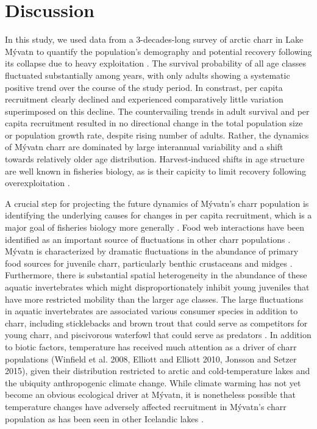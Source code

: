 
\section*{Discussion}

In this study, 
we used data from a 3-decades-long survey of arctic charr in Lake M\'{y}vatn
to quantify the population's demography and potential recovery 
following its collapse due to heavy exploitation 
\citep{gudbergsson2004}.
The survival probability of all age classes fluctuated substantially among years,
with only adults showing a systematic positive trend over the course of the study period.
In constrast, per capita recruitment clearly declined and experienced comparatively little
variation superimposed on this decline.
The countervailing trends in adult survival and per capita recruitment resulted 
in no directional change in the total population size or population growth rate,
despite rising number of adults.
Rather, the dynamics of  M\'{y}vatn charr are dominated by large interannual variability
and a shift towards relatively older age distribution.
Harvest-induced shifts in age structure are well known in fisheries biology,
as is their capicity to limit recovery following overexploitation 
\citep{hsieh2010fishing}.

A crucial step for projecting the future dynamics of M\'{y}vatn’s charr population 
is identifying the underlying causes for changes in per capita recruitment, 
which is a major goal of fisheries biology more generally 
\citep{houde2008emerging, ludsin2014physical, hansen2013rapid}.
Food web interactions have been identified as an important source 
of fluctuations in other charr populations 
\citep{snorrason1992population, amundsen1994piscivory, jonsson2015freshwater}.
M\'{y}vatn is characterized by dramatic fluctuations in the abundance 
of primary food sources for juvenile charr, particularly benthic crustaceans 
and midges 
\citep{einarsson2004clad, gardarsson2004population, gudbergsson2004}.
Furthermore, there is substantial spatial heterogeneity in the abundance 
of these aquatic invertebrates \citep{bartrons2015spatial} 
which might disproportionately inhibit young juveniles 
that have more restricted mobility than the larger age classes. 
The large fluctuations in aquatic invertebrates are associated various consumer species 
in addition to charr, including sticklebacks and brown trout that could serve 
as competitors for young charr, and piscivorous waterfowl that could serve as predators 
\citep{einarsson2004myvatn}. 
In addition to biotic factors, 
temperature has received much attention as a driver of charr populations 
\citep{winfield2008arctic, elliott2010temperature, jonsson2015freshwater}
(Winfield et al. 2008, Elliott and Elliott 2010, Jonsson and Setzer 2015), 
given their distribution restricted to arctic
and cold-temperature lakes \citep{klemetsen2003atlantic}
and the ubiquity anthropogenic climate change. 
While climate warming has not yet become an obvious ecological driver at M\'{y}vatn, 
it is nonetheless possible that temperature changes have adversely affected recruitment 
in M\'{y}vatn’s charr population as has been seen in other Icelandic lakes 
\citep{malmquist2009salmonid}. 